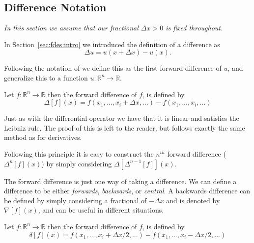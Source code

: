 \documentclass[../main.tex]{subfiles}
\begin{document}
  \subsection{Difference Notation}\label{sec:fdes:notation}
  \emph{In this section we assume that our fractional $\Delta x > 0$ is fixed throughout.}

  In Section~\ref{sec:fdes:intro} we introduced the definition of a difference as \\

  \begin{equation}
    \Delta u = u(x + \Delta x) - u(x).
  \end{equation}

  Following the notation of \cite{milne1933} we define this as the first forward difference of $u$, and generalize this to a function $u: \mathbb{R}^n \to \mathbb{R}$.

  \begin{definition}\label{fde:def:forward}
    Let $f: \mathbb{R}^n \to \mathbb{R}$ then the forward difference of $f$, is defined by
    \begin{equation}
      \Delta[f](x) = f(x_1, ..., x_i + \Delta x, ...) - f(x_1, ..., x_i, ...)
    \end{equation}
  \end{definition}

  \begin{remark}
    Just as with the differential operator we have that it is linear and satisfies the Leibniz rule. The proof of this is left to the reader, but follows exactly the same method as for derivatives.
  \end{remark}

  Following this principle it is easy to construct the $n^{th}$ forward difference ($\Delta ^n[f](x)$) by simply considering $\Delta [\Delta ^{n-1}[f]](x)$.

  The forward difference is just one way of taking a difference. We can define a difference to be either \emph{forwards}, \emph{backwards}, or \emph{central}. A backwards difference can be defined by simply considering a fractional of $- \Delta x$ and is denoted by $\nabla[f](x)$, and can be useful in different situations.

  \begin{definition}\label{fde:def:central}
    Let $f: \mathbb{R}^n \to \mathbb{R}$ then the forward difference of $f$, is defined by
     \begin{equation}
       \delta[f](x) = f(x_1, ..., x_i + \Delta x / 2, ...) - f(x_1, ..., x_i - \Delta x / 2, ...)
     \end{equation}
  \end{definition}
\end{document}
